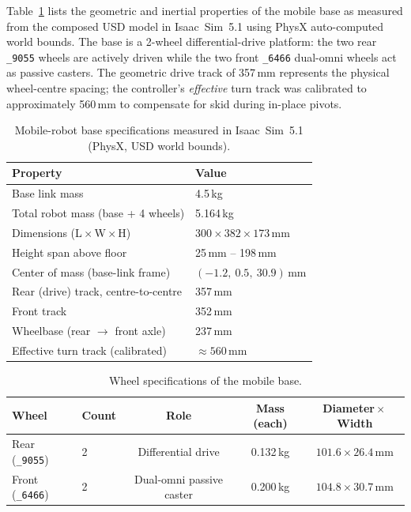 Table~\ref{tab:base_specs} lists the geometric and inertial properties of the mobile base as measured from the composed USD model in Isaac~Sim~5.1 using PhysX auto-computed world bounds. The base is a 2-wheel differential-drive platform: the two rear \texttt{\_9055} wheels are actively driven while the two front \texttt{\_6466} dual-omni wheels act as passive casters. The geometric drive track of 357\,mm represents the physical wheel-centre spacing; the controller's \emph{effective} turn track was calibrated to approximately 560\,mm to compensate for skid during in-place pivots.

\begin{table}[!htbp]
\centering
\caption{Mobile-robot base specifications measured in Isaac~Sim~5.1 (PhysX, USD world bounds).}
\label{tab:base_specs}
\small
\setlength{\tabcolsep}{5pt}
\begin{tabular}{@{}ll@{}}
\toprule
Property & Value \\
\midrule
Base link mass & 4.5\,kg \\
Total robot mass (base + 4 wheels) & 5.164\,kg \\
Dimensions (L\,$\times$\,W\,$\times$\,H) & $300 \times 382 \times 173$\,mm \\
Height span above floor & 25\,mm -- 198\,mm \\
Center of mass (base-link frame) & $(-1.2,\ 0.5,\ 30.9)$\,mm \\
Rear (drive) track, centre-to-centre & 357\,mm \\
Front track & 352\,mm \\
Wheelbase (rear $\to$ front axle) & 237\,mm \\
Effective turn track (calibrated) & $\approx 560$\,mm \\
\bottomrule
\end{tabular}
\end{table}

\begin{table}[!htbp]
\centering
\caption{Wheel specifications of the mobile base.}
\label{tab:wheel_specs}
\small
\setlength{\tabcolsep}{4pt}
\begin{tabular}{@{}llccc@{}}
\toprule
Wheel & Count & Role & Mass (each) & Diameter\,$\times$\,Width \\
\midrule
Rear (\texttt{\_9055})  & 2 & Differential drive       & 0.132\,kg & $101.6 \times 26.4$\,mm \\
Front (\texttt{\_6466}) & 2 & Dual-omni passive caster & 0.200\,kg & $104.8 \times 30.7$\,mm \\
\bottomrule
\end{tabular}
\end{table}

